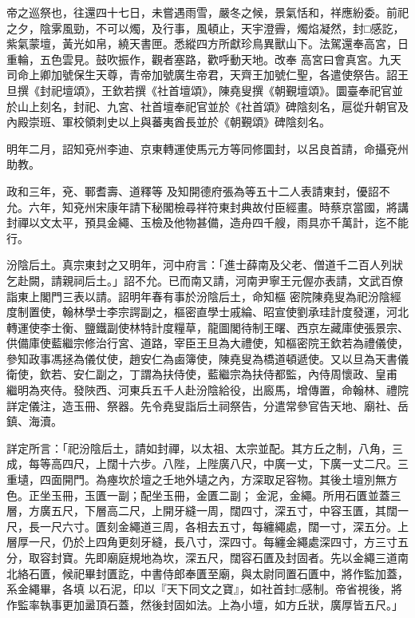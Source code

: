 \begin{pinyinscope}
 帝之巡祭也，往還四十七日，未嘗遇雨雪，嚴冬之候，景氣恬和，祥應紛委。前祀之夕，陰雺風勁，不可以燭，及行事，風頓止，天宇澄霽，燭焰凝然，封□感訖，紫氣蒙壇，黃光如帛，繞天書匣。悉縱四方所獻珍鳥異獸山下。法駕還奉高宮，日重輪，五色雲見。鼓吹振作，觀者塞路，歡呼動天地。改奉
 高宮曰會真宮。九天司命上卿加號保生天尊，青帝加號廣生帝君，天齊王加號仁聖，各遣使祭告。詔王旦撰《封祀壇頌》，王欽若撰《社首壇頌》，陳堯叟撰《朝覲壇頌》。圜臺奉祀官並於山上刻名，封祀、九宮、社首壇奉祀官並於《社首頌》碑陰刻名，扈從升朝官及內殿崇班、軍校領刺史以上與蕃夷酋長並於《朝覲頌》碑陰刻名。



 明年二月，詔知兗州李迪、京東轉運使馬元方等同修圜封，以呂良首請，命攝兗州助教。



 政和三年，兗、鄆耆壽、道釋等
 及知開德府張為等五十二人表請東封，優詔不允。六年，知兗州宋康年請下秘閣檢尋祥符東封典故付臣經畫。時蔡京當國，將講封禪以文太平，預具金繩、玉檢及他物甚備，造舟四千艘，雨具亦千萬計，迄不能行。



 汾陰后土。真宗東封之又明年，河中府言：「進士薛南及父老、僧道千二百人列狀乞赴闕，請親祠后土。」詔不允。已而南又請，河南尹寧王元偓亦表請，文武百僚詣東上閣門三表以請。詔明年春有事於汾陰后土，命知樞
 密院陳堯叟為祀汾陰經度制置使，翰林學士李宗諤副之，樞密直學士戚綸、昭宣使劉承珪計度發運，河北轉運使李士衡、鹽鐵副使林特計度糧草，龍圖閣待制王曙、西京左藏庫使張景宗、供備庫使藍繼宗修治行宮、道路，宰臣王旦為大禮使，知樞密院王欽若為禮儀使，參知政事馮拯為儀仗使，趙安仁為鹵簿使，陳堯叟為橋道頓遞使。又以旦為天書儀衛使，欽若、安仁副之，丁謂為扶侍使，藍繼宗為扶侍都監，內侍周懷政、皇甫
 繼明為夾侍。發陜西、河東兵五千人赴汾陰給役，出廄馬，增傳置，命翰林、禮院詳定儀注，造玉冊、祭器。先令堯叟詣后土祠祭告，分遣常參官告天地、廟社、岳鎮、海瀆。



 詳定所言：「祀汾陰后土，請如封禪，以太祖、太宗並配。其方丘之制，八角，三成，每等高四尺，上闊十六步。八陛，上陛廣八尺，中廣一丈，下廣一丈二尺。三重壝，四面開門。為瘞坎於壇之壬地外壝之內，方深取足容物。其後土壇別無方色。正坐玉冊，玉匱一副；配坐玉冊，金匱二副；
 金泥，金繩。所用石匱並蓋三層，方廣五尺，下層高二尺，上開牙縫一周，闊四寸，深五寸，中容玉匱，其闊一尺，長一尺六寸。匱刻金繩道三周，各相去五寸，每纏繩處，闊一寸，深五分。上層厚一尺，仍於上四角更刻牙縫，長八寸，深四寸。每纏金繩處深四寸，方三寸五分，取容封寶。先即廟庭規地為坎，深五尺，闊容石匱及封固者。先以金繩三道南北絡石匱，候祀畢封匱訖，中書侍郎奉匱至廟，與太尉同置石匱中，將作監加蓋，系金繩畢，各填
 以石泥，印以『天下同文之寶』，如社首封□感制。帝省視後，將作監率執事更加盝頂石蓋，然後封固如法。上為小壇，如方丘狀，廣厚皆五尺。」




\end{pinyinscope}
